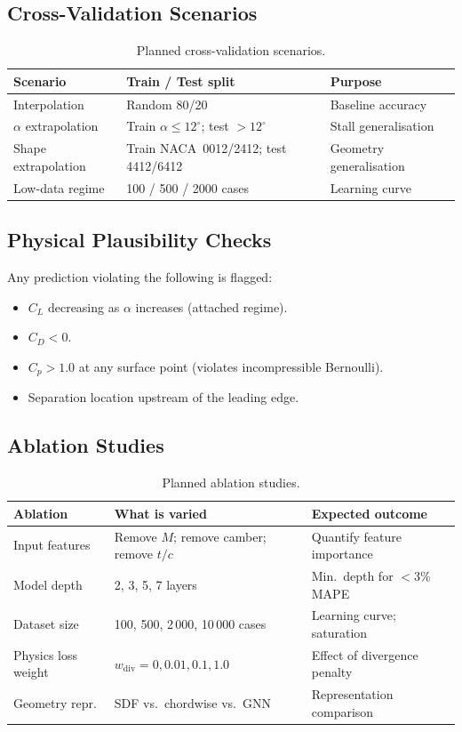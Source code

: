 \documentclass[11pt,a4paper]{article}
\begin{document}
\subsection{Cross-Validation Scenarios}

\begin{table}[!ht]
\centering
\caption{Planned cross-validation scenarios.}
\begin{tabular}{llp{5cm}}
\toprule
\textbf{Scenario} & \textbf{Train / Test split} & \textbf{Purpose} \\
\midrule
Interpolation       & Random 80/20  & Baseline accuracy \\
$\alpha$ extrapolation & Train $\alpha\le12^\circ$; test $>12^\circ$ & Stall generalisation \\
Shape extrapolation & Train NACA~0012/2412; test 4412/6412 & Geometry generalisation \\
Low-data regime     & 100 / 500 / 2000 cases & Learning curve \\
\bottomrule
\end{tabular}
\end{table}

\subsection{Physical Plausibility Checks}

Any prediction violating the following is flagged:
\begin{itemize}
  \item $C_L$ decreasing as $\alpha$ increases (attached regime).
  \item $C_D < 0$.
  \item $C_p > 1.0$ at any surface point (violates incompressible Bernoulli).
  \item Separation location upstream of the leading edge.
\end{itemize}

\subsection{Ablation Studies}

\begin{table}[!ht]
\centering
\caption{Planned ablation studies.}
\begin{tabular}{llp{5.5cm}}
\toprule
\textbf{Ablation} & \textbf{What is varied} & \textbf{Expected outcome} \\
\midrule
Input features     & Remove $M$; remove camber; remove $t/c$
  & Quantify feature importance \\
Model depth        & 2, 3, 5, 7 layers
  & Min.\ depth for $<3\%$ MAPE \\
Dataset size       & 100, 500, 2\,000, 10\,000 cases
  & Learning curve; saturation \\
Physics loss weight & $w_\text{div} = 0, 0.01, 0.1, 1.0$
  & Effect of divergence penalty \\
Geometry repr.     & SDF vs.\ chordwise vs.\ GNN
  & Representation comparison \\
\bottomrule
\end{tabular}
\end{table}
\end{document}
